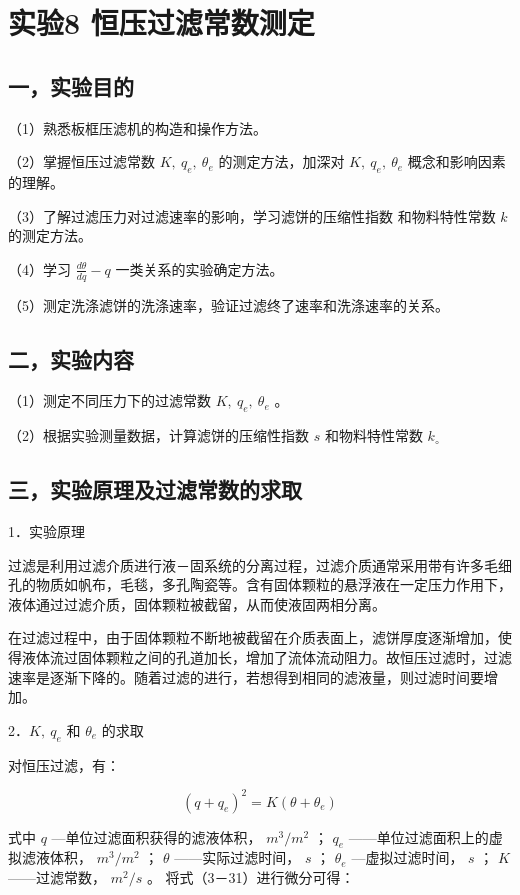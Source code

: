 \documentclass[
]{article}
\author{}
\date{}
\begin{document}
\section{实验8 恒压过滤常数测定}

\subsection{一，实验目的}

（1）熟悉板框压滤机的构造和操作方法。

（2）掌握恒压过滤常数 $K, ~ q_e, ~ \theta_e$ 的测定方法，加深对 $K, ~ q_e, ~ \theta_e$ 概念和影响因素的理解。

（3）了解过滤压力对过滤速率的影响，学习滤饼的压缩性指数 和物料特性常数 $k$ 的测定方法。

（4）学习 $\frac{d \theta}{d q}-q$ 一类关系的实验确定方法。

（5）测定洗涤滤饼的洗涤速率，验证过滤终了速率和洗涤速率的关系。

\subsection{二，实验内容}

（1）测定不同压力下的过滤常数 $K, ~ q_e, ~ \theta_e$ 。

（2）根据实验测量数据，计算滤饼的压缩性指数 $s$ 和物料特性常数 $k_{\circ}$

\subsection{三，实验原理及过滤常数的求取}

1．实验原理

过滤是利用过滤介质进行液－固系统的分离过程，过滤介质通常采用带有许多毛细孔的物质如帆布，毛毯，多孔陶瓷等。含有固体颗粒的悬浮液在一定压力作用下，液体通过过滤介质，固体颗粒被截留，从而使液固两相分离。

在过滤过程中，由于固体颗粒不断地被截留在介质表面上，滤饼厚度逐渐增加，使得液体流过固体颗粒之间的孔道加长，增加了流体流动阻力。故恒压过滤时，过滤速率是逐渐下降的。随着过滤的进行，若想得到相同的滤液量，则过滤时间要增加。

2．$K, ~ q_e$ 和 $\theta_e$ 的求取

对恒压过滤，有：

$$
\left(q+q_e\right)^2=K\left(\theta+\theta_e\right)
$$

式中 $q$ —单位过滤面积获得的滤液体积， $m^3 / m^2$ ；
$q_e$ ——单位过滤面积上的虚拟滤液体积， $m^3 / m^2$ ；
$\theta$ ——实际过滤时间， $s$ ；
$\theta_e$ —虚拟过滤时间， $s$ ；
$K$ ——过滤常数， $m^2 / s$ 。
将式（3－31）进行微分可得：
\end{document}
